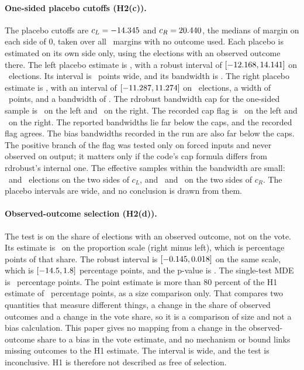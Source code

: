\documentclass[11pt]{article}
\newcommand{\ppd}[2]{\pgfmathparse{#2}\pgfmathprintnumber[fixed,precision=#1]{\pgfmathresult}}
\begin{document}
\paragraph{One-sided placebo cutoffs (H2(c)).}
The placebo cutoffs are $c_L=-14.345$ and $c_R=20.440$, the medians of margin on each side of 0, taken over all \RdDensityN\ margins with no outcome used. Each placebo is estimated on its own side only, using the elections with an observed outcome there. The left placebo estimate is \RdPlaceboLeftEst, with a robust interval of $[-12.168, 14.141]$ on \RdPlaceboLeftN\ elections. Its interval is \RdPlaceboLeftCiwidth\ points wide, and its bandwidth is \RdPlaceboLeftBw. The right placebo estimate is \RdPlaceboRightEst, with an interval of $[-11.287, 11.274]$ on \RdPlaceboRightN\ elections, a width of \RdPlaceboRightCiwidth\ points, and a bandwidth of \RdPlaceboRightBw. The rdrobust bandwidth cap for the one-sided sample is \RdPlaceboLeftBwmax\ on the left and \RdPlaceboRightBwmax\ on the right. The recorded cap flag is \RdPlaceboLeftCapped\ on the left and \RdPlaceboRightCapped\ on the right. The reported bandwidths lie far below the caps, and the recorded flag agrees. The bias bandwidths recorded in the run are also far below the caps. The positive branch of the flag was tested only on forced inputs and never observed on output; it matters only if the code's cap formula differs from rdrobust's internal one. The effective samples within the bandwidth are small: \RdPlaceboLeftNhLeft\ and \RdPlaceboLeftNhRight\ elections on the two sides of $c_L$, and \RdPlaceboRightNhLeft\ and \RdPlaceboRightNhRight\ on the two sides of $c_R$. The placebo intervals are wide, and no conclusion is drawn from them.

\paragraph{Observed-outcome selection (H2(d)).}
The test is on the share of elections with an observed outcome, not on the vote. Its estimate is \RdSelectionCoef\ on the proportion scale (right minus left), which is \ppd{1}{100*(\RdSelectionCoef)} percentage points of that share. The robust interval is $[-0.145, 0.018]$ on the same scale, which is $[\ppd{1}{100*(\RdSelectionCiLow)}, \ppd{1}{100*(\RdSelectionCiHigh)}]$ percentage points, and the p-value is \RdSelectionP. The single-test MDE is \RdSelectionMde\ percentage points. The point estimate is more than 80 percent of the H1 estimate of \RdEffect\ percentage points, as a size comparison only. That compares two quantities that measure different things, a change in the share of observed outcomes and a change in the vote share, so it is a comparison of size and not a bias calculation. This paper gives no mapping from a change in the observed-outcome share to a bias in the vote estimate, and no mechanism or bound links missing outcomes to the H1 estimate. The interval is wide, and the test is inconclusive. H1 is therefore not described as free of selection.
\end{document}
